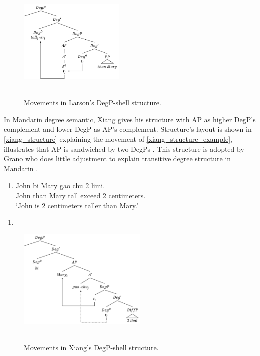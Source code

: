 \documentclass{ctexart}
\let \cite \parencite
\begin{document}
\begin{figure}[H]
    \centering
    \includegraphics[width=0.45\textwidth]{Pic/larson1.png}
    \begin{caption}
        \\ \vspace{-1.1ex}
        Movements in Larson's DegP-shell structure.
    \end{caption}
\end{figure}

In Mandarin degree semantic, Xiang gives his structure with AP as higher DegP's complement and lower DegP as AP's complement. Structure's layout is shown in \ref{xiang_structure} explaining the movement of \ref{xiang_structure_example}, illustrates that AP is sandwiched by two DegPs \cite{xiang2005}. This structure is adopted by Grano who does little adjustment to explain transitive degree structure in Mandarin \cite{grano2012}. 

\begin{enumerate}
    \item \label{xiang_structure_example}
    John bi Mary gao chu 2 limi.  \\
    John than Mary tall exceed 2 centimeters. \\
    `John is 2 centimeters taller than Mary.'
\end{enumerate}

\begin{enumerate}
    \item \label{xiang_structure}
\end{enumerate}

\begin{figure}[H]
    \centering
    \includegraphics[width=0.55\textwidth]{Pic/xiang.png}
    \begin{caption}
        \\ \vspace{-1.1ex}
        Movements in Xiang's DegP-shell structure.
    \end{caption}
\end{figure}
\end{document}
